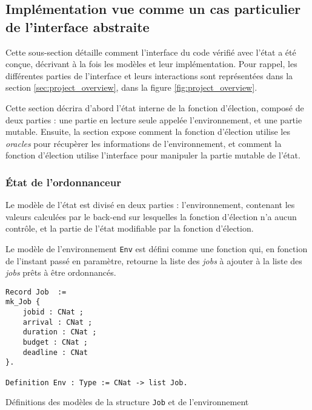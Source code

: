 		\subsection{Implémentation vue comme un cas particulier de l'interface abstraite}
	\label{sec:monad}

	Cette sous-section détaille comment l'interface du code vérifié avec l'état a été conçue, décrivant à la fois les modèles et leur implémentation.
	Pour rappel, les différentes parties de l'interface et leurs interactions sont représentées dans la section \ref{sec:project_overview}, dans la figure \ref{fig:project_overview}.

	Cette section décrira d'abord l'état interne de la fonction d'élection, composé de deux parties : une partie en lecture seule appelée l'environnement, et une partie mutable. Ensuite, la section expose comment la fonction d'élection utilise les \emph{oracles} pour récupèrer les informations de l'environnement, et comment la fonction d'élection utilise l'interface pour manipuler la partie mutable de l'état.

	\subsubsection{État de l'ordonnanceur}

	Le modèle de l'état est divisé en deux parties : l'environnement, contenant les valeurs calculées par le back-end sur lesquelles la fonction d'élection n'a aucun contrôle, et la partie de l'état modifiable par la fonction d'élection.

	Le modèle de l'environnement \texttt{Env} est défini comme une fonction qui, en fonction de l'instant passé en paramètre, retourne la liste des \emph{jobs} à ajouter à la liste des \emph{jobs} prêts à être ordonnancés.
\begin{listing}[ht]
\begin{verbatim}
Record Job  :=
mk_Job {
    jobid : CNat ;
    arrival : CNat ;
    duration : CNat ;
    budget : CNat ;
    deadline : CNat
}.

Definition Env : Type := CNat -> list Job.
\end{verbatim}
\caption{Définitions des modèles de la structure \texttt{Job} et de l'environnement}
\label{code:job_env_definition}
\end{listing}


